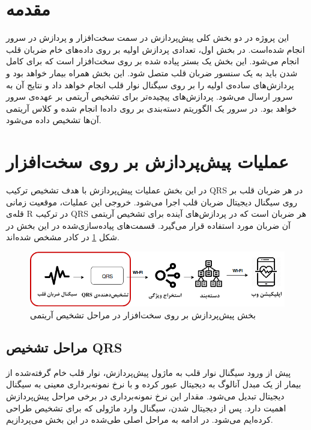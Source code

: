 
\pagebreak

\section{مقدمه}
 این پروژه در دو بخش کلی پیش‌پردازش در سمت سخت‌افزار و پردازش در سرور انجام شده‌است. در بخش اول، تعدادی پردازش اولیه بر روی داده‌های خام ضربان قلب انجام می‌شود. این بخش یک بستر پیاده شده بر روی سخت‌افزار است که برای کامل شدن باید به یک سنسور ضربان قلب متصل شود. این بخش همراه بیمار خواهد بود و پردازش‌های ساده‌ی اولیه را بر روی سیگنال نوار قلب انجام خواهد داد و نتایج آن به سرور ارسال می‌شود.  پردازش‌های پیچیده‌تر برای تشخیص آریتمی بر عهده‌ی سرور خواهد بود. در سرور یک الگوریتم دسته‌بندی بر روی داده‌ا انجام شده و کلاس آریتمی آن‌ها تشخیص داده می‌شود.

\section{عملیات پیش‌پردازش بر روی سخت‌افزار} 
در این بخش عملیات پیش‌پردازش با هدف تشخیص ترکیب QRS در هر ضربان قلب بر روی سیگنال دیجیتال ضربان قلب اجرا می‌شود. خروجی این عملیات، موقعیت زمانی قله‌ی R در ترکیب QRS هر ضربان است که در پردازش‌های آینده برای تشخیص آریتمی آن ضربان مورد استفاده قرار می‌گیرد. قسمت‌های پیاده‌سازی‌شده در این بخش در شکل \ref{fig:preprocessing} در کادر مشخص شده‌اند.
\begin{figure}[!htb]
\centering
\includegraphics[width=16cm]{Figures/preprocessing.png}
\caption{بخش پیش‌پردازش بر روی سخت‌افزار در مراحل تشخیص آریتمی}
\label{fig:preprocessing}
\end{figure}
	\subsection{مراحل تشخیص QRS}

	پیش از ورود سیگنال نوار قلب به ماژول پیش‌پردازش، نوار قلب خام گرفته‌شده از بیمار  از یک مبدل آنالوگ به دیجیتال عبور کرده و با نرخ نمونه‌برداری معینی به سیگنال دیجیتال تبدیل می‌شود. مقدار این نرخ نمونه‌برداری در برخی مراحل پیش‌پردازش اهمیت دارد. 
پس از دیجیتال شدن، سیگنال وارد ماژولی که برای تشخیص  طراحی کرده‌ایم می‌شود. در ادامه به مراحل اصلی طی‌شده در این بخش می‌پردازیم.
